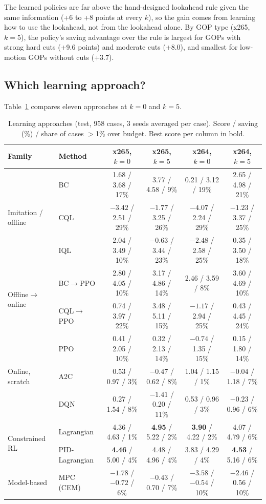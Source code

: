 \documentclass[conference]{IEEEtran}
\newcommand{\cqlppo}{CQL$\to$PPO}
\newcommand{\bcppo}{BC$\to$PPO}
\begin{document}
The learned policies are far above the hand-designed lookahead rule given the same information (+6 to +8 points at every $k$), so the gain comes from learning how to use the lookahead, not from the lookahead alone. By GOP type (x265, $k{=}5$), the policy's saving advantage over the rule is largest for GOPs with strong hard cuts (+9.6 points) and moderate cuts (+8.0), and smallest for low-motion GOPs without cuts (+3.7).

\subsection{Which learning approach?}\label{sec:methods}
Table~\ref{tab:methods} compares eleven approaches at $k{=}0$ and $k{=}5$.

\begin{table}[t]
\centering\footnotesize
\caption{Learning approaches (test, 958 cases, 3 seeds averaged per case). Score / saving (\%) / share of cases $>$1\% over budget. Best score per column in bold.}
\label{tab:methods}
\begin{tabular}{@{}l l cccc@{}}
\toprule
Family & Method & x265, $k{=}0$ & x265, $k{=}5$ & x264, $k{=}0$ & x264, $k{=}5$\\
\midrule
\multirow{3}{*}{Imitation / offline} & BC & 1.68 / 3.68 / 17\% & 3.77 / 4.58 / 9\% & 0.21 / 3.12 / 19\% & 2.65 / 4.98 / 21\%\\
 & CQL & $-3.42$ / 2.51 / 29\% & $-1.77$ / 3.25 / 26\% & $-4.07$ / 2.24 / 29\% & $-1.23$ / 3.37 / 25\%\\
 & IQL & 2.04 / 3.49 / 10\% & $-0.63$ / 3.44 / 23\% & $-2.48$ / 2.58 / 25\% & 0.35 / 3.50 / 18\%\\
\midrule
\multirow{2}{*}{Offline$\to$online} & \bcppo & 2.80 / 4.05 / 10\% & 3.17 / 4.86 / 14\% & 2.46 / 3.59 / 8\% & 3.60 / 4.69 / 10\%\\
 & \cqlppo & 0.74 / 3.97 / 22\% & 3.48 / 5.11 / 15\% & $-1.17$ / 2.94 / 25\% & 0.43 / 4.45 / 24\%\\
\midrule
\multirow{3}{*}{Online, scratch} & PPO & 0.41 / 2.05 / 10\% & 0.32 / 2.13 / 14\% & $-0.74$ / 1.35 / 15\% & 0.15 / 1.80 / 14\%\\
 & A2C & 0.53 / 0.97 / 3\% & $-0.47$ / 0.62 / 8\% & 1.04 / 1.15 / 1\% & $-0.04$ / 1.18 / 7\%\\
 & DQN & 0.27 / 1.54 / 8\% & $-1.41$ / 0.20 / 11\% & 0.53 / 0.96 / 3\% & $-0.23$ / 0.96 / 6\%\\
\midrule
\multirow{2}{*}{Constrained RL} & Lagrangian & 4.36 / 4.63 / 1\% & \textbf{4.95} / 5.22 / 2\% & \textbf{3.90} / 4.22 / 2\% & 4.07 / 4.79 / 6\%\\
 & PID-Lagrangian & \textbf{4.46} / 5.00 / 4\% & 4.48 / 4.96 / 4\% & 3.83 / 4.29 / 4\% & \textbf{4.53} / 5.16 / 6\%\\
\midrule
Model-based & MPC (CEM) & $-1.78$ / $-0.72$ / 6\% & $-0.43$ / 0.70 / 7\% & $-3.58$ / $-0.54$ / 10\% & $-2.46$ / 0.56 / 10\%\\
\bottomrule
\end{tabular}
\end{table}
\end{document}

